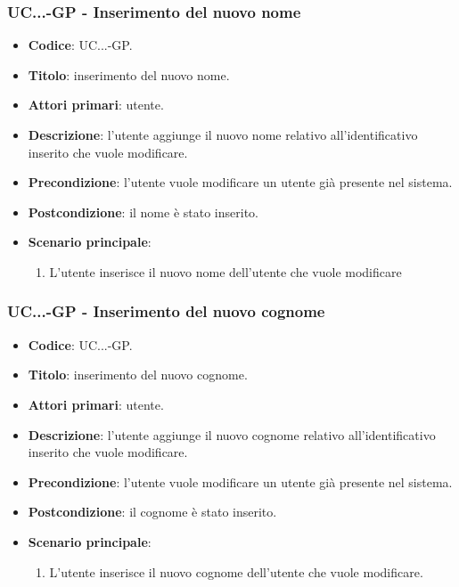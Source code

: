 			\subsubsection{UC\theuccount.\thesubuccount.\thesubsubuccount.\thesubsubsubuccount-GP - Inserimento del nuovo nome}
				
				\begin{itemize}
					\item \textbf{Codice}: UC\theuccount.\thesubuccount.\thesubsubuccount.\thesubsubsubuccount-GP.
					\item \textbf{Titolo}: inserimento del nuovo nome.
					\item \textbf{Attori primari}: utente.
					\item \textbf{Descrizione}: l'utente aggiunge il nuovo nome relativo all'identificativo inserito che vuole modificare.
					\item \textbf{Precondizione}: l'utente vuole modificare un utente già presente nel sistema.
					\item \textbf{Postcondizione}: il nome è stato inserito.
					\item \textbf{Scenario principale}:
					\begin{enumerate}
						\item L'utente inserisce il nuovo nome dell'utente che vuole modificare
					\end{enumerate}
				\end{itemize}
			
			\subsubsection{UC\theuccount.\thesubuccount.\thesubsubuccount.\thesubsubsubuccount-GP - Inserimento del nuovo cognome}
				
				\begin{itemize}
					\item \textbf{Codice}: UC\theuccount.\thesubuccount.\thesubsubuccount.\thesubsubsubuccount-GP.
					\item \textbf{Titolo}: inserimento del nuovo cognome.
					\item \textbf{Attori primari}: utente.
					\item \textbf{Descrizione}: l'utente aggiunge il nuovo cognome relativo all'identificativo inserito che vuole modificare.
					\item \textbf{Precondizione}: l'utente vuole modificare un utente già presente nel sistema.
					\item \textbf{Postcondizione}: il cognome è stato inserito.
					\item \textbf{Scenario principale}:
					\begin{enumerate}
						\item L'utente inserisce il nuovo cognome dell'utente che vuole modificare.
					\end{enumerate}
				\end{itemize}
			
